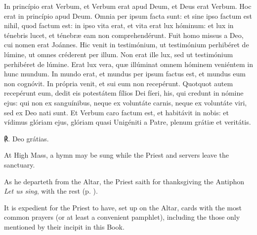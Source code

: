 In princípio erat Verbum, et Verbum erat apud Deum, et Deus erat Verbum. Hoc erat in princípio apud Deum. Omnia per ipsum facta sunt: et sine ipso factum est nihil, quod factum est: in ipso vita erat, et vita erat lux hóminum: et lux in ténebris lucet, et ténebræ eam non comprehendérunt.
Fuit homo missus a Deo, cui nomen erat Joánnes. Hic venit in testimónium, ut testimónium perhibéret de lúmine, ut omnes créderent per illum. Non erat ille lux, sed ut testimónium perhibéret de lúmine.
Erat lux vera, quæ illúminat omnem hóminem veniéntem in hunc mundum. In mundo erat, et mundus per ipsum factus est, et mundus eum non cognóvit. In própria venit, et sui eum non recepérunt. Quotquot autem recepérunt eum, dedit eis potestátem fílios Dei fíeri, his, qui credunt in nómine ejus: qui non ex sanguínibus, neque ex voluntáte carnis, neque ex voluntáte viri, sed ex Deo nati sunt.  Et Verbum caro factum est,  et habitávit in nobis: et vídimus glóriam ejus, glóriam quasi Unigéniti a Patre, plenum gráti{\ae} et veritátis.\par
℟. Deo grátias.
\begin{rubric}
    At High Mass, a hymn may be sung while the Priest and servers leave the sanctuary.
\end{rubric}
\begin{rubric}
    As he departeth from the Altar, the Priest saith for thanksgiving the Antiphon \emph{Let us sing}, with the rest (p. \pageref{CommunionThanksgiving}).
\end{rubric}
\label{GeneralRubrics}
\begin{rubric}
    It is expedient for the Priest to have, set up on the Altar, cards with the most common prayers (or at least a convenient pamphlet), including the those only mentioned by their incipit in this Book.\par
\end{rubric}
